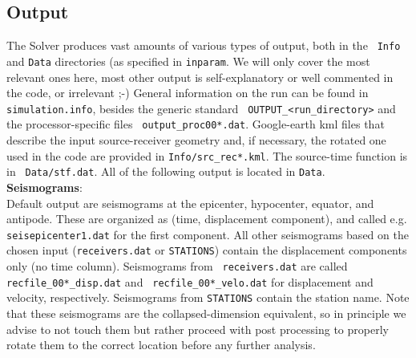 \documentclass[11pt,letter,fleqn,english,notitlepage]{article}
\begin{document}
\subsection{Output}
The Solver produces vast amounts of various types of output, both in the {\tt
Info} and {\tt Data} directories (as specified in {\tt inparam}. We will only
cover the most relevant ones here, most other output is self-explanatory or
well commented in the code, or irrelevant ;-) General information on the run
can be found in {\tt simulation.info}, besides the generic standard {\tt
OUTPUT\_<run\_directory>} and the processor-specific files {\tt
output\_proc00*.dat}. Google-earth kml files that describe the input
source-receiver geometry and, if necessary, the rotated one used in the code
are provided in {\tt Info/src\_rec*.kml}.  The source-time function is in {\tt
Data/stf.dat}. All of the following output is located in {\tt Data}.\\

\noindent \textbf{Seismograms}: \\
Default output are seismograms at the epicenter, hypocenter, equator, and
antipode. These are organized as (time, displacement component), and called
e.g. {\tt seisepicenter1.dat} for the first component.  All other seismograms
based on the chosen input ({\tt receivers.dat} or {\tt STATIONS}) contain the
displacement components only (no time column). Seismograms from {\tt
receivers.dat} are called {\tt recfile\_00*\_disp.dat} and {\tt
recfile\_00*\_velo.dat} for displacement and velocity, respectively.
Seismograms from {\tt STATIONS} contain the station name. Note that these
seismograms are the collapsed-dimension equivalent, so in principle we advise
to not touch them but rather proceed with post processing to properly rotate
them to the correct location before any further analysis.\\
\end{document}
